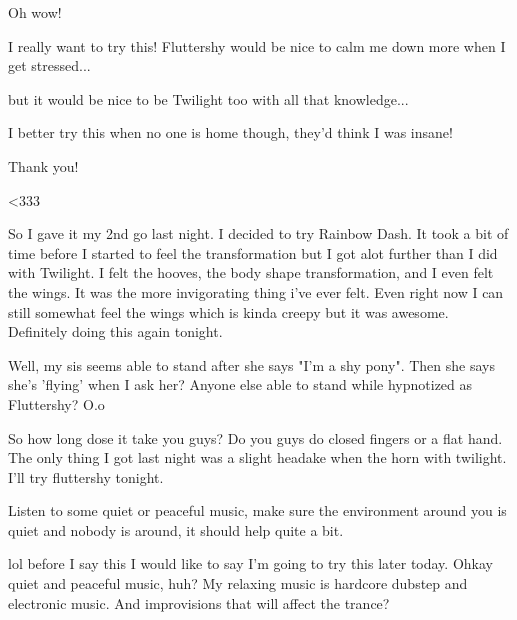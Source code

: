 \documentclass[ebook,12pt,oneside,openany]{memoir}
\begin{document}
\begin{tcolorbox}[title=PastelShades]
\par{Oh wow!}
\par{I really want to try this! Fluttershy would be nice to calm me down more when I get stressed...}
\par{but it would be nice to be Twilight too with all that knowledge...}
\par{I better try this when no one is home though, they'd think I was insane!}
\newline{}
\par{Thank you!}
\par{<333}
\end{tcolorbox}
\begin{tcolorbox}[title=AngelofDeath]
\par{So I gave it my 2nd go last night. I decided to try Rainbow Dash. It took a bit of time before I started to feel the transformation but I got alot further than I did with Twilight. I felt the hooves, the body shape transformation, and I even felt the wings. It was the more invigorating thing i've ever felt. Even right now I can still somewhat feel the wings which is kinda creepy but it was awesome. Definitely doing this again tonight.}
\end{tcolorbox}
\begin{tcolorbox}[title=Scarletthealicorn,colback=lime!5!white,colframe=lime!75!black,coltitle=white]
\par{Well, my sis seems able to stand after she says "I'm a shy pony". Then she says she's 'flying' when I ask her? Anyone else able to stand while hypnotized as Fluttershy? O.o}
\end{tcolorbox}
\begin{tcolorbox}[title=Skycoaster]
\par{So how long dose it take you guys? Do you guys do closed fingers or a flat hand. The only thing I got last night was a slight headake when the horn with twilight. I'll try fluttershy tonight.}
\end{tcolorbox}
\begin{tcolorbox}[title=Theory404]
\begin{tcolorbox}[title=Ponyworld Destroyer]
\par{Listen to some quiet or peaceful music, make sure the environment around you is quiet and nobody is around, it should help quite a bit.}
\end{tcolorbox}
lol before I say this I would like to say I'm going to try this later today. Ohkay quiet and peaceful music, huh? My relaxing music is hardcore dubstep and electronic music. And improvisions that will affect the trance?\end{tcolorbox}
\end{document}
